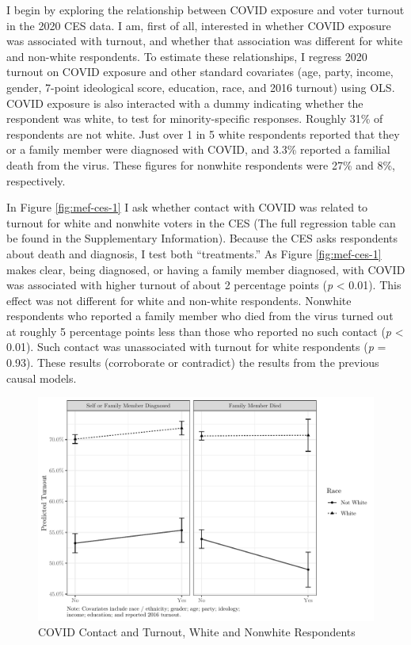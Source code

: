 \documentclass[
  12pt,
]{article}
\begin{document}
I begin by exploring the relationship between COVID exposure and voter turnout in the 2020 CES data. I am, first of all, interested in whether COVID exposure was associated with turnout, and whether that association was different for white and non-white respondents. To estimate these relationships, I regress 2020 turnout on COVID exposure and other standard covariates (age, party, income, gender, 7-point ideological score, education, race, and 2016 turnout) using OLS. COVID exposure is also interacted with a dummy indicating whether the respondent was white, to test for minority-specific responses. Roughly 31\% of respondents are not white. Just over 1 in 5 white respondents reported that they or a family member were diagnosed with COVID, and 3.3\% reported a familial death from the virus. These figures for nonwhite respondents were 27\% and 8\%, respectively.

In Figure \ref{fig:mef-ces-1} I ask whether contact with COVID was related to turnout for white and nonwhite voters in the CES (The full regression table can be found in the Supplementary Information). Because the CES asks respondents about death and diagnosis, I test both ``treatments.'' As Figure \ref{fig:mef-ces-1} makes clear, being diagnosed, or having a family member diagnosed, with COVID was associated with higher turnout of about 2 percentage points (\emph{p} \textless{} 0.01). This effect was not different for white and non-white respondents. Nonwhite respondents who reported a family member who died from the virus turned out at roughly 5 percentage points less than those who reported no such contact (\emph{p} \textless{} 0.01). Such contact was unassociated with turnout for white respondents (\emph{p} = 0.93). These results (corroborate or contradict) the results from the previous causal models.

\begin{figure}[H]

{\centering \includegraphics{wa_covid_files/figure-latex/mef1-1} 

}

\caption{\label{fig:mef-ces-1}COVID Contact and Turnout, White and Nonwhite Respondents}\label{fig:mef1}
\end{figure}
\end{document}
